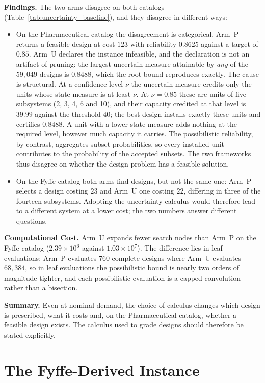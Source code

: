 \documentclass[11pt]{article}
\begin{document}
\textbf{Findings.} The two arms disagree on both catalogs (Table~\ref{tab:uncertainty_baseline}), and they disagree in different ways:
\begin{itemize}
\item On the Pharmaceutical catalog the disagreement is categorical. Arm~P returns a feasible design at cost $123$ with reliability $0.8625$ against a target of $0.85$. Arm~U declares the instance infeasible, and the declaration is not an artifact of pruning: the largest uncertain measure attainable by \emph{any} of the $59{,}049$ designs is $0.8488$, which the root bound reproduces exactly. The cause is structural. At a confidence level $\nu$ the uncertain measure credits only the units whose state measure is at least $\nu$. At $\nu = 0.85$ these are units of five subsystems (2, 3, 4, 6 and 10), and their capacity credited at that level is $39.99$ against the threshold $40$; the best design installs exactly these units and certifies $0.8488$. A unit with a lower state measure adds nothing at the required level, however much capacity it carries. The possibilistic reliability, by contrast, aggregates subset probabilities, so every installed unit contributes to the probability of the accepted subsets. The two frameworks thus disagree on whether the design problem has a feasible solution.
\item On the Fyffe catalog both arms find designs, but not the same one: Arm~P selects a design costing $23$ and Arm~U one costing $22$, differing in three of the fourteen subsystems. Adopting the uncertainty calculus would therefore lead to a different system at a lower cost; the two numbers answer different questions.
\end{itemize}

\textbf{Computational Cost.} Arm~U expands fewer search nodes than Arm~P on the Fyffe catalog ($2.39\times10^{6}$ against $1.03\times10^{7}$). The difference lies in leaf evaluations: Arm~P evaluates $760$ complete designs where Arm~U evaluates $68{,}384$, so in leaf evaluations the possibilistic bound is nearly two orders of magnitude tighter, and each possibilistic evaluation is a capped convolution rather than a bisection.

\textbf{Summary.} Even at nominal demand, the choice of calculus changes which design is prescribed, what it costs and, on the Pharmaceutical catalog, whether a feasible design exists. The calculus used to grade designs should therefore be stated explicitly.

\section{The Fyffe-Derived Instance} \label{sec:supp_fyffe}
\end{document}
